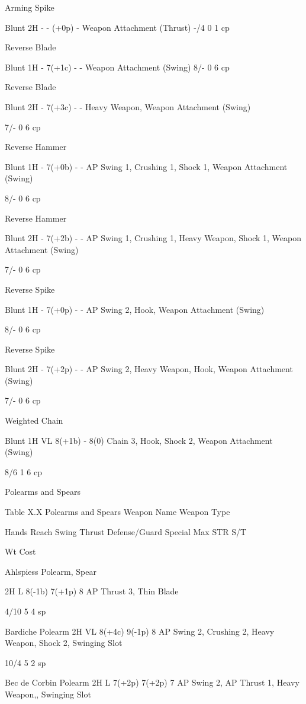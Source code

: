 \documentclass[oneside,11pt,english]{book}
\begin{document}
Arming 
Spike 

Blunt 2H - - (+0p) - Weapon Attachment (Thrust) -/4 0 1 cp 

Reverse 
Blade 

Blunt 1H - 7(+1c) - - Weapon Attachment (Swing) 8/- 0 6 cp 

Reverse 
Blade 

Blunt 2H - 7(+3c) - - Heavy Weapon, Weapon 
Attachment (Swing) 

7/- 0 6 cp 

Reverse 
Hammer 

Blunt 1H - 7(+0b) - - AP Swing 1, Crushing 1, 
Shock 1, Weapon Attachment 
(Swing) 

8/- 0 6 cp 

Reverse 
Hammer 

Blunt 2H - 7(+2b) - - AP Swing 1, Crushing 1, 
Heavy Weapon, Shock 1, 
Weapon Attachment (Swing) 

7/- 0 6 cp 

Reverse 
Spike 

Blunt 1H - 7(+0p) - - AP Swing 2, Hook, Weapon 
Attachment (Swing) 

8/- 0 6 cp 

Reverse 
Spike 

Blunt 2H - 7(+2p) - - AP Swing 2, Heavy Weapon, 
Hook, Weapon Attachment 
(Swing) 

7/- 0 6 cp 


Weighted 
Chain 

Blunt 1H VL 8(+1b) - 8(0) Chain 3, Hook, 
Shock 2, Weapon Attachment 
(Swing) 

8/6 1 6 cp 

 

Polearms and Spears 

 
Table X.X Polearms and Spears 
Weapon Name Weapon 
Type 

Hands Reach Swing Thrust Defense/Guard Special Max 
STR 
S/T 

Wt Cost 

Ahlspiess Polearm, 
Spear 

2H L 8(-1b) 7(+1p) 8 AP Thrust 3, Thin 
Blade 

4/10 5 4 sp 

Bardiche Polearm 2H VL 8(+4c) 9(-1p) 8 AP Swing 2, 
Crushing 2, Heavy 
Weapon, Shock 2, 
Swinging Slot 

10/4 5 2 sp 

Bec de Corbin Polearm 2H L 7(+2p) 7(+2p) 7 AP Swing 2, AP 
Thrust 1, Heavy 
Weapon,, 
Swinging Slot 
\end{document}
